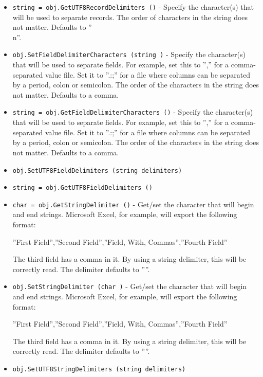 \begin{itemize}
\item  \verb|string = obj.GetUTF8RecordDelimiters ()| -  Specify the character(s) that will be used to separate records.
 The order of characters in the string does not matter.  Defaults
 to ''\r\\n''.

\item  \verb|obj.SetFieldDelimiterCharacters (string )| -  Specify the character(s) that will be used to separate fields.  For
 example, set this to '','' for a comma-separated value file.  Set
 it to ''.:;'' for a file where columns can be separated by a
 period, colon or semicolon.  The order of the characters in the
 string does not matter.  Defaults to a comma.

\item  \verb|string = obj.GetFieldDelimiterCharacters ()| -  Specify the character(s) that will be used to separate fields.  For
 example, set this to '','' for a comma-separated value file.  Set
 it to ''.:;'' for a file where columns can be separated by a
 period, colon or semicolon.  The order of the characters in the
 string does not matter.  Defaults to a comma.

\item  \verb|obj.SetUTF8FieldDelimiters (string delimiters)|

\item  \verb|string = obj.GetUTF8FieldDelimiters ()|

\item  \verb|char = obj.GetStringDelimiter ()| -  Get/set the character that will begin and end strings.  Microsoft
 Excel, for example, will export the following format:

 ''First Field'',''Second Field'',''Field, With, Commas'',''Fourth Field''

 The third field has a comma in it.  By using a string delimiter,
 this will be correctly read.  The delimiter defaults to ''''.

\item  \verb|obj.SetStringDelimiter (char )| -  Get/set the character that will begin and end strings.  Microsoft
 Excel, for example, will export the following format:

 ''First Field'',''Second Field'',''Field, With, Commas'',''Fourth Field''

 The third field has a comma in it.  By using a string delimiter,
 this will be correctly read.  The delimiter defaults to ''''.

\item  \verb|obj.SetUTF8StringDelimiters (string delimiters)|


\end{itemize}
